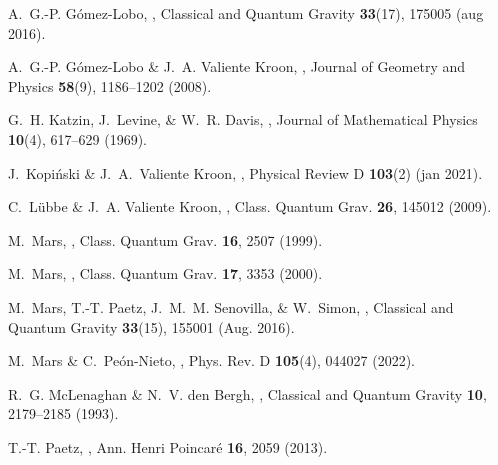 \documentclass[10pt,a4paper]{article}
\theoremstyle{plain}
\begin{document}
\begin{thebibliography}{10}
A.~G.-P. G{\'{o}}mez-Lobo,
,
\newblock Classical and Quantum Gravity {\bf 33}(17), 175005 (aug 2016).

A.~G.-P. Gómez-Lobo \& J.~A. {Valiente Kroon},
,
\newblock Journal of Geometry and Physics {\bf 58}(9), 1186--1202 (2008).

G.~H. Katzin, J.~Levine, \& W.~R. Davis,
,
\newblock Journal of Mathematical Physics {\bf 10}(4), 617--629 (1969).

J.~Kopi\'nski \& J.~A.~Valiente Kroon,
,
\newblock Physical Review D {\bf 103}(2) (jan 2021).

C.~L\"ubbe \& J.~A. {Valiente Kroon},
,
\newblock Class. Quantum Grav. {\bf 26}, 145012 (2009).

M.~Mars,
,
\newblock Class. Quantum Grav. {\bf 16}, 2507 (1999).

M.~Mars,
,
\newblock Class. Quantum Grav. {\bf 17}, 3353 (2000).

M.~{Mars}, T.-T. {Paetz}, J.~M.~M. {Senovilla}, \& W.~{Simon},
,
\newblock Classical and Quantum Gravity {\bf 33}(15), 155001 (Aug. 2016).

M.~Mars \& C.~Pe\'on-Nieto,
,
\newblock Phys. Rev. D {\bf 105}(4), 044027 (2022).

R.~G. McLenaghan \& N.~V. den Bergh,
,
\newblock Classical and Quantum Gravity {\bf 10}, 2179--2185 (1993).

T.-T. Paetz,
,
\newblock Ann. Henri Poincar\'{e} {\bf 16}, 2059 (2013).


\end{thebibliography}
\end{document}
